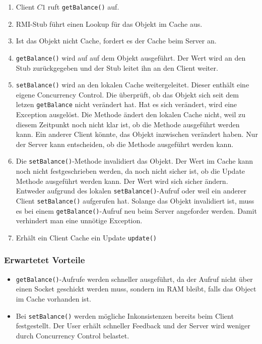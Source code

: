 \begin{enumerate}
\item Client $C1$ ruft \verb+getBalance()+ auf.
\item RMI-Stub führt einen Lookup für das Objekt im Cache aus.
\item Ist das Objekt nicht Cache, fordert es der Cache beim Server an.
\item \verb+getBalance()+ wird auf auf dem Objekt ausgeführt. Der Wert wird an den Stub zurückgegeben und der Stub leitet ihn an den Client weiter.
\item \verb+setBalance()+ wird an den lokalen Cache weitergeleitet. Dieser enthält eine eigene Concurrency Control. Die überprüft, ob das Objekt sich seit dem letzen \verb+getBalance+ nicht verändert hat. Hat es sich verändert, wird eine Exception ausgelöst. Die Methode ändert den lokalen Cache nicht, weil zu diesem Zeitpunkt noch nicht klar ist, ob die Methode ausgeführt werden kann. Ein anderer Client könnte, das Objekt inzwischen verändert haben. Nur der Server kann entscheiden, ob die Methode ausgeführt werden kann.
\item Die \verb+setBalance()+-Methode invalidiert das Objekt. Der Wert im Cache kann noch nicht festgeschrieben werden, da noch nicht sicher ist, ob die Update Methode ausgeführt werden kann. Der Wert wird sich sicher ändern. Entweder aufgrund des lokalen \verb+setBalance()+-Aufruf oder weil ein anderer Client \verb+setBalance()+ aufgerufen hat. Solange das Objekt invalidiert ist, muss es bei einem \verb+getBalance()+-Aufruf neu beim Server angeforder werden. Damit verhindert man eine unnötige Exception.
\item Erhält ein Client Cache ein Update \verb+update()+
\end{enumerate}


\subsubsection{Erwartetet Vorteile}
\label{sec:erwartetet-vorteile}

\begin{itemize}
\item \verb+getBalance()+-Aufrufe werden schneller ausgeführt, da der Aufruf nicht über einen Socket geschickt werden muss, sondern im RAM bleibt, falls das Object im Cache vorhanden ist.
\item Bei \verb+setBalance()+ werden mögliche Inkonsistenzen bereits beim Client festgestellt. Der User erhält schneller Feedback und der Server wird weniger durch Concurrency Control belastet.
\end{itemize}

